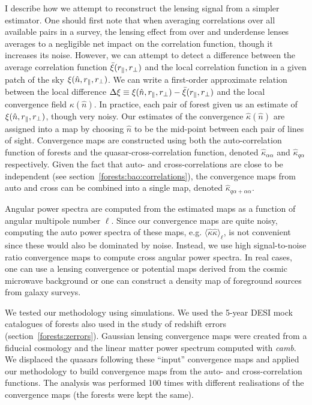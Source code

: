 I describe how we attempt to reconstruct the lensing signal 
from a simpler estimator. 
One should first note that when averaging correlations over all available pairs in a survey, 
the lensing effect from over and underdense lenses averages to a negligible net impact 
on the correlation function, though it increases its noise.
However, we can attempt to detect a difference 
between the average correlation function $\bar{\xi}({r_\parallel}, {r_\perp})$ 
and the local correlation function in a given patch of the sky 
$\xi(\hat{n}, {r_\parallel}, {r_\perp})$. 
We can write a first-order approximate relation between the local 
difference $\Delta \xi \equiv  \xi(\hat{n}, {r_\parallel}, {r_\perp}) - \bar{\xi}({r_\parallel}, {r_\perp})$
and the local convergence field $\kappa(\hat{n})$.
In practice, each pair of forest given us an estimate of $\xi(\hat{n}, {r_\parallel}, {r_\perp})$,
though very noisy. 
Our estimates of the convergence $\hat{\kappa}(\hat{n})$ are assigned into a 
map by choosing $\hat{n}$ to  be  the mid-point between each pair of lines of sight. 
Convergence maps are constructed using both the auto-correlation function of forests 
and the quasar-\lya cross-correlation function, denoted $\hat{\kappa}_{\alpha \alpha}$ 
and $\hat{\kappa}_{q \alpha}$ respectively. 
Given the fact that auto- and cross-correlations are close to be independent 
(see section~\ref{forests:bao:correlations}), the convergence maps from auto and cross
can be combined into a single map, denoted $\hat{\kappa}_{q \alpha + \alpha \alpha}$. 

Angular power spectra are computed from the estimated maps as a function of 
angular multipole number $\ell$. 
Since our convergence maps are quite noisy, computing the auto 
power spectra of these maps, e.g. $\langle \hat{\kappa} \hat{\kappa} \rangle_\ell$, 
is not convenient since these would also be dominated by noise. 
Instead, we use high signal-to-noise ratio convergence maps to compute cross 
angular power spectra. In real cases, one can use a lensing convergence or potential 
maps derived from the cosmic microwave background or one can construct a 
density map of foreground sources from galaxy surveys. 

We tested our methodology using simulations. 
We used the 5-year DESI mock catalogues of \lya forests also used in the study of redshift
errors (section~\ref{forests:zerrors}). 
Gaussian lensing convergence maps were created from a fiducial cosmology and the 
linear matter power spectrum computed with \textsl{camb}. 
We displaced the quasars following these ``input'' convergence maps 
and applied our methodology to build convergence maps 
from the auto- and cross-correlation functions. 
The analysis was performed 100 times with different realisations of the convergence maps
(the forests were kept the same). 

